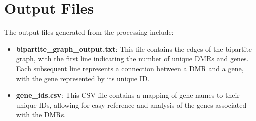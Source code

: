 \documentclass{article}
\begin{document}
\section{Output Files}
The output files generated from the processing include:

\begin{itemize}
    \item \textbf{bipartite_graph_output.txt}: This file contains the edges of the bipartite graph, with the first line indicating the number of unique DMRs and genes. Each subsequent line represents a connection between a DMR and a gene, with the gene represented by its unique ID.
    \item \textbf{gene_ids.csv}: This CSV file contains a mapping of gene names to their unique IDs, allowing for easy reference and analysis of the genes associated with the DMRs.
\end{itemize}
\end{document}
